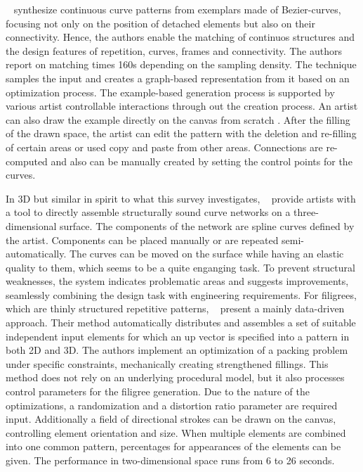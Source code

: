 \citeauthor*{tu_2020_cct}~\cite{tu_2020_cct} synthesize continuous curve patterns from exemplars made of Bezier-curves, focusing not only on the position of detached elements but also on their connectivity. Hence, the authors enable the matching of continuos structures and the design features of repetition, curves, frames and connectivity. The authors report on matching times 160s depending on the sampling density. The technique samples the input and creates a graph-based representation from it based on an optimization process. The example-based generation process is supported by various artist controllable interactions through out the creation process. An artist can also draw the example directly on the canvas from scratch . After the filling of the drawn space, the artist can edit the pattern with the deletion and re-filling of certain areas or used copy and paste from other areas. Connections are re-computed and also can be manually created by setting the control points for the curves.

In 3D but similar in spirit to what this survey investigates, \citeauthor*{zehnder_2016_dso}~\cite{zehnder_2016_dso} provide artists with a tool to directly assemble structurally sound curve networks on a three-dimensional surface. The components of the network are spline curves defined by the artist. Components can be placed manually or are repeated semi-automatically. The curves can be moved on the surface while having an elastic quality to them, which seems to be a quite enganging task. To prevent structural weaknesses, the system indicates problematic areas and suggests improvements, seamlessly combining the design task with engineering requirements. For filigrees, which are thinly structured repetitive patterns, \citeauthor*{chen_2016_sof}~\cite{chen_2016_sof} present a mainly data-driven approach. Their method automatically distributes and assembles a set of suitable independent input elements for which an up vector is specified into a pattern in both 2D and 3D. The authors implement an optimization of a packing problem under specific constraints, mechanically creating strengthened fillings. This method does not rely on an underlying procedural model, but it also processes control parameters for the filigree generation. Due to the nature of the optimizations, a randomization and a distortion ratio parameter are required input. Additionally a field of directional strokes can be drawn on the canvas, controlling element orientation and size. When multiple elements are combined into one common pattern, percentages for appearances of the elements can be given. The performance in two-dimensional space runs from 6 to 26 seconds.

